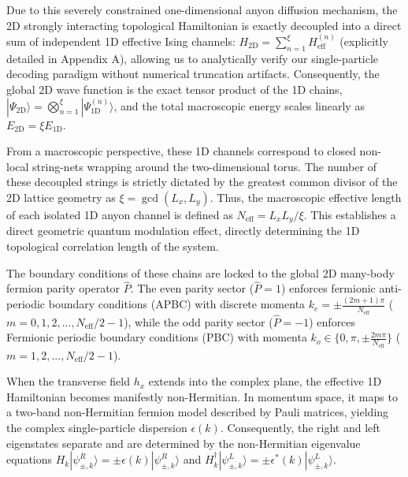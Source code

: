 \documentclass[aps,prb,floatfix,superscriptaddress,reprint]{revtex4-2}
\begin{document}
Due to this severely constrained one-dimensional anyon diffusion mechanism, the 2D strongly interacting topological Hamiltonian is exactly decoupled into a direct sum of independent 1D effective Ising channels: $H_{\mathrm{2D}} = \sum_{n=1}^{\xi} H_{\mathrm{eff}}^{(n)}$ (explicitly detailed in Appendix \textcolor[rgb]{0.00,0.07,1.00}{A}), allowing us to analytically verify our single-particle decoding paradigm without numerical truncation artifacts. Consequently, the global 2D wave function is the exact tensor product of the 1D chains, $|\Psi_{\mathrm{2D}}\rangle = \bigotimes_{n=1}^\xi |\Psi_{\mathrm{1D}}^{(n)}\rangle$, and the total macroscopic energy scales linearly as $E_{\mathrm{2D}} = \xi E_{\mathrm{1D}}$.

From a macroscopic perspective, these 1D channels correspond to closed non-local string-nets wrapping around the two-dimensional torus. The number of these decoupled strings is strictly dictated by the greatest common divisor of the 2D lattice geometry as $\xi = \gcd(L_x, L_y)$. Thus, the macroscopic effective length of each isolated 1D anyon channel is defined as $N_{\mathrm{eff}} = L_x L_y / \xi$. This establishes a direct geometric quantum modulation effect, directly determining the 1D topological correlation length of the system.

The boundary conditions of these chains are locked to the global 2D many-body fermion parity operator $\hat{P}$. The even parity sector ($\hat{P}=1$) enforces fermionic anti-periodic boundary conditions (APBC) with discrete momenta $k_e = \pm \frac{(2m+1)\pi}{N_{\mathrm{eff}}}$ ($m=0,1,2,...,N_{\mathrm{eff}}/2-1$), while the odd parity sector ($\hat{P}=-1$) enforces Fermionic periodic boundary conditions (PBC) with momenta $k_o \in \{ 0, \pi, \pm \frac{2m\pi}{N_{\mathrm{eff}}} \}$ ($m=1,2,...,N_{\mathrm{eff}}/2-1$).

When the transverse field $h_x$ extends into the complex plane, the effective 1D Hamiltonian becomes manifestly non-Hermitian. In momentum space, it maps to a two-band non-Hermitian fermion model described by Pauli matrices, yielding the complex single-particle dispersion $\epsilon(k)$. Consequently, the right and left eigenstates separate and are determined by the non-Hermitian eigenvalue equations $H_k|\psi_{\pm,k}^R\rangle =\pm\epsilon(k)|\psi_{\pm,k}^R\rangle$ and $H_k^{\dagger}|\psi_{\pm,k}^L\rangle =\pm\epsilon^*(k)|\psi_{\pm,k}^L\rangle$.
\end{document}
